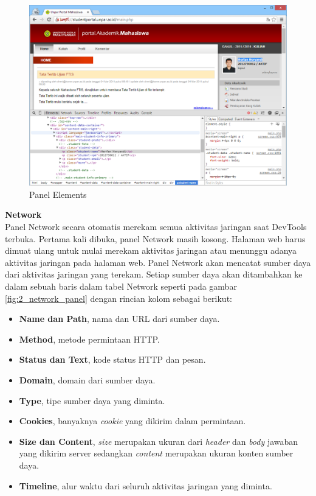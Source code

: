 \documentclass[a4paper,twoside]{article}
\begin{document}
\begin{enumerate}
\begin{enumerate}
\begin{figure}[H]
	\centering
	\includegraphics[scale=0.5]{Gambar/elements-panel}
	\caption{Panel Elements} 
	\label{fig:2_elements_panel}
\end{figure}

\textbf{Network}\\
Panel Network secara otomatis merekam semua aktivitas jaringan saat DevTools terbuka. Pertama kali dibuka, panel Network masih kosong. Halaman web harus dimuat ulang untuk mulai merekam aktivitas jaringan atau menunggu adanya aktivitas jaringan pada halaman web. Panel Network akan mencatat sumber daya dari aktivitas jaringan yang terekam. Setiap sumber daya akan ditambahkan ke dalam sebuah baris dalam tabel Network seperti pada gambar \ref{fig:2_network_panel} dengan rincian kolom sebagai berikut:
\begin{itemize}
	\item \textbf{Name dan Path}, nama dan URL dari sumber daya.
	\item \textbf{Method}, metode permintaan HTTP.
	\item \textbf{Status dan Text}, kode status HTTP dan pesan.
	\item \textbf{Domain}, domain dari sumber daya.
	\item \textbf{Type}, tipe sumber daya yang diminta.
	\item \textbf{Cookies}, banyaknya \textit{cookie} yang dikirim dalam permintaan.
	\item \textbf{Size dan Content}, \textit{size} merupakan ukuran dari \textit{header} dan \textit{body} jawaban yang dikirim server sedangkan \textit{content} merupakan ukuran konten sumber daya.
	\item \textbf{Timeline}, alur waktu dari seluruh aktivitas jaringan yang diminta.
\end{itemize}


\end{enumerate}
\end{enumerate}
\end{document}
